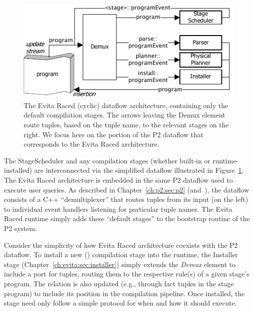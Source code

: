 \begin{figure}[htbp]
\begin{center}
\includegraphics[scale=1.5]{figures/DefaultCompiler}
\ssp
\caption{The Evita Raced (cyclic) dataflow architecture, containing only the 
default compilation stages. The arrows leaving the Demux element
route tuples, based on the tuple name, to the relevant stages on the right.
We focus here on the portion of the P2 dataflow that corresponds 
to the Evita Raced architecture.}
\label{ch:evita:fig:basecompiler}
\end{center}
\end{figure}

The StageScheduler and any compilation stages (whether built-in or
runtime-installed) are interconnected via the simplified dataflow illustrated
in Figure~\ref{ch:evita:fig:basecompiler}.  The Evita Raced architecture is
embedded in the same P2 dataflow used to execute user queries.  As described in
Chapter~\ref{ch:p2:sec:p2} (and~\cite{p2:sosp}), the dataflow consists of a C++
``demultiplexer'' that routes tuples from its input (on the left) to individual
event handlers listening for particular tuple names.  The Evita Raced runtime
simply adds these ``default stages'' to the bootstrap routine of the P2 system.

Consider the simplicity of how Evita Raced architecture coexists with the P2
dataflow.  To install a new (\OVERLOG) compilation stage into the runtime, the
Installer stage (Chapter~\ref{ch:evita:sec:installer}) simply extends the {\em
Demux} element to include a port for  tuples, routing
them to the respective rule(s) of a given stage's \OVERLOG program.  The
 relation is also updated (e.g., through fact tuples in the
\OVERLOG stage program) to include its position in the compilation pipeline.
Once installed, the \OVERLOG stage need only follow a simple protocol for when
and how it should execute.

